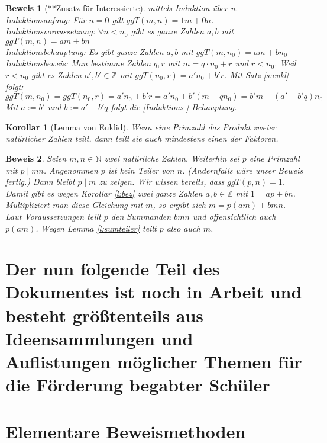 \documentclass[a4paper]{article}
\newtheorem{korollar}[satz]{Korollar}
\theoremstyle{nonumberplain}
\newtheorem{beweis}{Beweis}
\begin{document}
\begin{beweis}[**Zusatz für Interessierte]
mittels Induktion über n.\\
Induktionsanfang: Für $n = 0$ gilt $ggT(m,n) = 1m + 0n$.\\
Induktionsvoraussetzung: $\forall n<n_0$ gibt es ganze Zahlen $a,b$ mit $ggT(m,n) = am + bn$\\
Induktionsbehauptung: Es gibt ganze Zahlen $a,b$ mit $ggT(m,n_0) = am + bn_0$\\
Induktionsbeweis: Man bestimme Zahlen $q,r$ mit $m = q \cdot n_0 + r$ und $r<n_0$. Weil $r<n_0$ gibt es Zahlen $a',b' \in \mathbb{Z}$ mit $ggT(n_0,r) = a'n_0 + b'r$. Mit Satz \ref{s:eukl} folgt:\\
$ggT(m,n_0) = ggT(n_0,r) = a'n_0 + b'r = a'n_0 + b'(m - qn_0) = b'm + (a'-b'q)n_0$\\
Mit $a:= b'$ und $b:=a'-b'q$ folgt die [Induktions-] Behauptung.
\end{beweis}

\begin{korollar}[Lemma von Euklid]
Wenn eine Primzahl das Produkt zweier natürlicher Zahlen teilt, dann teilt sie auch mindestens einen der Faktoren.
\end{korollar}

\begin{beweis}
Seien $m,n \in \mathbb{N}$ zwei natürliche Zahlen. Weiterhin sei $p$ eine Primzahl mit $p \mid mn$. Angenommen $p$ ist kein Teiler von $n$. (Andernfalls wäre unser Beweis fertig.) Dann bleibt $p \mid m$ zu zeigen. Wir wissen bereits, dass $ggT(p,n) = 1$. Damit gibt es wegen Korollar \ref{l:bez} zwei ganze Zahlen $a,b \in \mathbb{Z}$ mit $1 = ap + bn$. Multipliziert man diese Gleichung mit $m$, so ergibt sich $m = p(am) + bmn$. Laut Voraussetzungen teilt $p$ den Summanden $bmn$ und offensichtlich auch $p(am)$. Wegen Lemma \ref{l:sumteiler} teilt $p$ also auch $m$.
\end{beweis}


\part{Der nun folgende Teil des Dokumentes ist noch in Arbeit und besteht größtenteils aus Ideensammlungen und Auflistungen möglicher Themen für die Förderung begabter Schüler}



\part{Elementare Beweismethoden}
\end{document}

